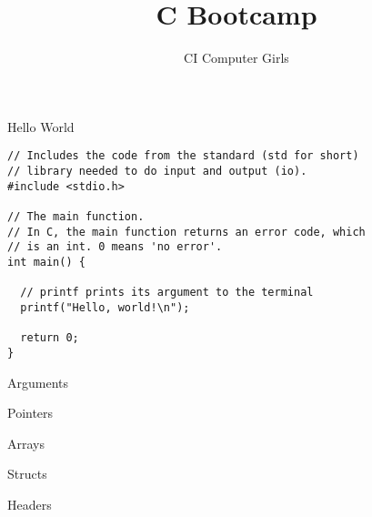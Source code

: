\documentclass[pdf]{beamer}
\title{C Bootcamp}
\author{CI Computer Girls}
\begin{document}
\begin{frame}
  \titlepage%
\end{frame}

\begin{frame}[fragile]{Hello World}
\begin{verbatim}
// Includes the code from the standard (std for short)
// library needed to do input and output (io).
#include <stdio.h>

// The main function.
// In C, the main function returns an error code, which
// is an int. 0 means 'no error'.
int main() {

  // printf prints its argument to the terminal
  printf("Hello, world!\n");

  return 0;
}
\end{verbatim}


\end{frame}

\begin{frame}{Arguments}

\end{frame}

\begin{frame}{Pointers}

\end{frame}

\begin{frame}{Arrays}

\end{frame}

\begin{frame}{Structs}

\end{frame}

\begin{frame}{Headers}

\end{frame}
\end{document}
